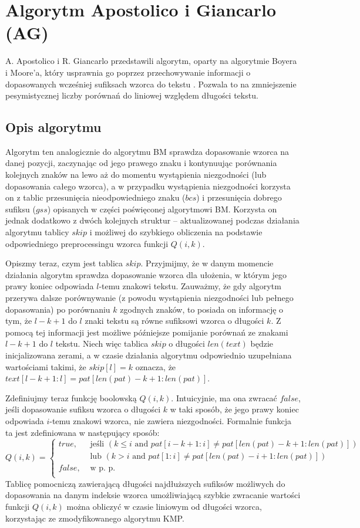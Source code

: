 \newpage
\section{Algorytm Apostolico i Giancarlo (AG)}
A. Apostolico i R. Giancarlo przedstawili algorytm, oparty na algorytmie Boyera i Moore’a, który usprawnia go poprzez przechowywanie informacji o dopasowanych wcześniej sufiksach wzorca do tekstu \cite{AG}. Pozwala to na zmniejszenie pesymistycznej liczby porównań do liniowej względem długości tekstu.

\subsection{Opis algorytmu}
Algorytm ten analogicznie do algorytmu BM sprawdza dopasowanie wzorca na danej pozycji, zaczynając od jego prawego znaku i kontynuując porównania kolejnych znaków na lewo aż do momentu wystąpienia niezgodności (lub dopasowania całego wzorca), a w przypadku wystąpienia niezgodności korzysta on z tablic przesunięcia nieodpowiedniego znaku ($bcs$) i przesunięcia dobrego sufiksu ($gss$) opisanych w części poświęconej algorytmowi BM. Korzysta on jednak dodatkowo z dwóch kolejnych struktur -- aktualizowanej podczas działania algorytmu tablicy $skip$ i możliwej do szybkiego obliczenia na podstawie odpowiedniego preprocessingu wzorca funkcji $Q(i,k)$.

Opiszmy teraz, czym jest tablica $skip$. Przyjmijmy, że w danym momencie działania algorytm sprawdza dopasowanie wzorca dla ułożenia, w którym jego prawy koniec odpowiada $l$-temu znakowi tekstu. Zauważmy, że gdy algorytm przerywa dalsze porównywanie (z powodu wystąpienia niezgodności lub pełnego dopasowania) po porównaniu $k$ zgodnych znaków, to posiada on informację o tym, że $l-k+1$ do $l$ znaki tekstu są równe sufiksowi wzorca o długości $k$. Z pomocą tej informacji jest możliwe późniejsze pomijanie porównań ze znakami $l-k+1$ do $l$ tekstu. Niech więc tablica $skip$ o długości $len(text)$ będzie inicjalizowana zerami, a w czasie działania algorytmu odpowiednio uzupełniana wartościami takimi, że $skip[l] = k$ oznacza, że $text[l-k+1:l]=pat[len(pat)-k+1:len(pat)]$.

Zdefiniujmy teraz funkcję boolowską $Q(i,k)$. Intuicyjnie, ma ona zwracać $false$, jeśli dopasowanie sufiksu wzorca o długości $k$ w taki sposób, że jego prawy koniec odpowiada $i$-temu znakowi wzorca, nie zawiera niezgodności. Formalnie funkcja ta jest zdefiniowana w następujący sposób:
\[
    Q(i,k)= 
    \begin{cases}
        true,& \text{ jeśli } (k \leq i \text{ and } pat[i-k+1:i] \neq pat[len(pat)-k+1:len(pat)])\\
        & \text{ lub } (k > i \text{ and } pat[1:i] \neq pat[len(pat)-i+1:len(pat)])\\
        false,& \text{ w p. p. }\\
    \end{cases}
\]
Tablicę pomocniczą zawierającą długości najdłuższych sufiksów możliwych do dopasowania na danym indeksie wzorca umożliwiającą szybkie zwracanie wartości funkcji $Q(i,k)$ można obliczyć w czasie liniowym od długości wzorca, korzystając ze zmodyfikowanego algorytmu KMP.

